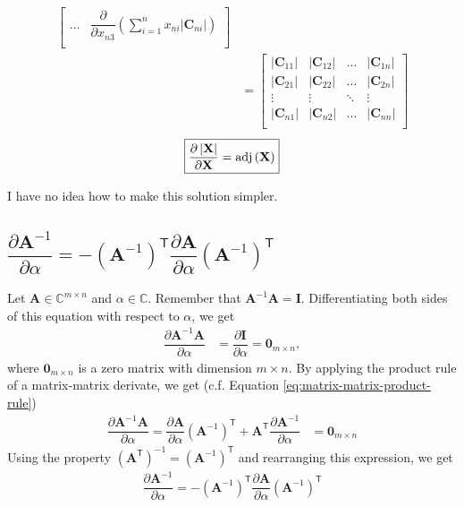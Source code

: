 \documentclass{article}
\newcommand{\trans}{\mathsf{T}}
\newcommand{\adj}[1]{\ensuremath{\textnormal{adj}\left(#1\right)}} %
\newcommand\abs[1]{\left\lvert#1\right\rvert}
\begin{document}
\begin{align}
\begin{bmatrix}
        \dots & 
        \displaystyle \dfrac{\partial}{\partial x_{n3}} \left( \sum_{i = 1}^{n} x_{ni} \abs{\mathbf{C}_{ni}} \right) \\
    \end{bmatrix} \\
    &= \begin{bmatrix}
        \abs{\mathbf{C}_{11}} & \abs{\mathbf{C}_{12}} & \dots & \abs{\mathbf{C}_{1n}} \\
        \abs{\mathbf{C}_{21}} & \abs{\mathbf{C}_{22}} & \dots & \abs{\mathbf{C}_{2n}} \\
        \vdots & \vdots & \ddots & \vdots \\
        \abs{\mathbf{C}_{n1}} & \abs{\mathbf{C}_{n2}} & \dots & \abs{\mathbf{C}_{nn}} \\
    \end{bmatrix}
\end{align}
\begin{align}
    \boxed{\dfrac{\partial \abs{\mathbf{X}}}{\partial \mathbf{X}} = \adj{\mathbf{X}}}
\end{align}

I have no idea how to make this solution simpler.

\subsection{\(\dfrac{\partial \mathbf{A}^{-1}}{\partial \alpha} = - {\left( \mathbf{A}^{-1} \right)}^{\trans} \dfrac{\partial \mathbf{A}}{\partial \alpha} {\left( \mathbf{A}^{-1} \right)}^{\trans}\)}
Let \(\mathbf{A}\in \mathbb{C}^{m\times n}\) and \(\alpha \in \mathbb{C}\). Remember that \(\mathbf{A}^{-1}\mathbf{A} = \mathbf{I}\). Differentiating both sides of this equation with respect to \(\alpha\), we get
\begin{align}
    \dfrac{\partial \mathbf{A}^{-1}\mathbf{A}}{\partial \alpha} & = \dfrac{\partial \mathbf{I}}{\partial \alpha} = \mathbf{0}_{m \times n},
\end{align}
where \(\mathbf{0}_{m \times n}\) is a zero matrix with dimension \(m \times n\). By applying the product rule of a matrix-matrix derivate, we get (c.f. Equation \eqref{eq:matrix-matrix-product-rule})
\begin{align}
    \dfrac{\partial \mathbf{A}^{-1}\mathbf{A}}{\partial \alpha} =  \dfrac{\partial \mathbf{A}}{\partial \alpha} \left( \mathbf{A}^{-1} \right)^{\trans} + \mathbf{A}^{\trans} \dfrac{\partial \mathbf{A}^{-1}}{\partial \alpha} & = \mathbf{0}_{m \times n}
\end{align}
Using the property \(\left( \mathbf{A}^{\trans} \right)^{-1} = \left( \mathbf{A}^{-1} \right)^{\trans}\) and rearranging this expression, we get
\begin{align}
    \boxed{\dfrac{\partial \mathbf{A}^{-1}}{\partial \alpha} = - {\left( \mathbf{A}^{-1} \right)}^{\trans} \dfrac{\partial \mathbf{A}}{\partial \alpha} {\left( \mathbf{A}^{-1} \right)}^{\trans}}
\end{align}

\nocite{*}
\printbibliography
\end{document}
